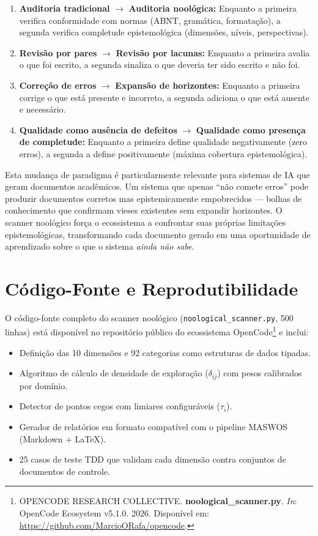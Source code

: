\begin{enumerate}
  \item \textbf{Auditoria tradicional} $\rightarrow$ \textbf{Auditoria noológica:} Enquanto a primeira verifica conformidade com normas (ABNT, gramática, formatação), a segunda verifica completude epistemológica (dimensões, níveis, perspectivas).

  \item \textbf{Revisão por pares} $\rightarrow$ \textbf{Revisão por lacunas:} Enquanto a primeira avalia o que foi escrito, a segunda sinaliza o que deveria ter sido escrito e não foi.

  \item \textbf{Correção de erros} $\rightarrow$ \textbf{Expansão de horizontes:} Enquanto a primeira corrige o que está presente e incorreto, a segunda adiciona o que está ausente e necessário.

  \item \textbf{Qualidade como ausência de defeitos} $\rightarrow$ \textbf{Qualidade como presença de completude:} Enquanto a primeira define qualidade negativamente (zero erros), a segunda a define positivamente (máxima cobertura epistemológica).
\end{enumerate}

Esta mudança de paradigma é particularmente relevante para sistemas de IA que geram documentos acadêmicos. Um sistema que apenas ``não comete erros'' pode produzir documentos corretos mas epistemicamente empobrecidos --- bolhas de conhecimento que confirmam vieses existentes sem expandir horizontes. O scanner noológico força o ecossistema a confrontar suas próprias limitações epistemológicas, transformando cada documento gerado em uma oportunidade de aprendizado sobre o que o sistema \textit{ainda não sabe}.

\section{Código-Fonte e Reprodutibilidade}

O código-fonte completo do scanner noológico (\texttt{noological\_scanner.py}, 500 linhas) está disponível no repositório público do ecossistema OpenCode\footnote{
  OPENCODE RESEARCH COLLECTIVE. \textbf{noological\_scanner.py}. \textit{In}: OpenCode Ecosystem v5.1.0. 2026. Disponível em: \url{https://github.com/MarcioORafa/opencode}.
} e inclui:

\begin{itemize}
  \item Definição das 10 dimensões e 92 categorias como estruturas de dados tipadas.
  \item Algoritmo de cálculo de densidade de exploração ($\delta_{ij}$) com pesos calibrados por domínio.
  \item Detector de pontos cegos com limiares configuráveis ($\tau_i$).
  \item Gerador de relatórios em formato compatível com o pipeline MASWOS (Markdown + LaTeX).
  \item 25 casos de teste TDD que validam cada dimensão contra conjuntos de documentos de controle.
\end{itemize}

